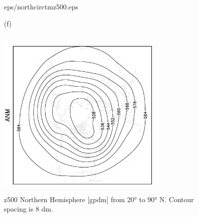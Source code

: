 \documentclass[12pt,a4paper,twoside,openright,headinclude,liststotoc,bibtotoc]{scrreprt}
\begin{document}
\begin{appendix}
\begin{figure}[c]
{{eps/northcirctmz500.eps}
}
\parbox{8.5cm}{\hspace{0.80cm} \begin{scriptsize}(f) \end{scriptsize} \vspace{-0.5cm} \\
\includegraphics[height=7.5cm,angle=-90]
{eps/northcirct21tmz500.eps}
}
\caption[z500 Northern Hemisphere]{z500 Northern Hemisphere [gpdm] from 20° to 90° N. Contour spacing is 8 dm.}
\label{img:z500north}
\end{figure}




\end{appendix}
\end{document}
